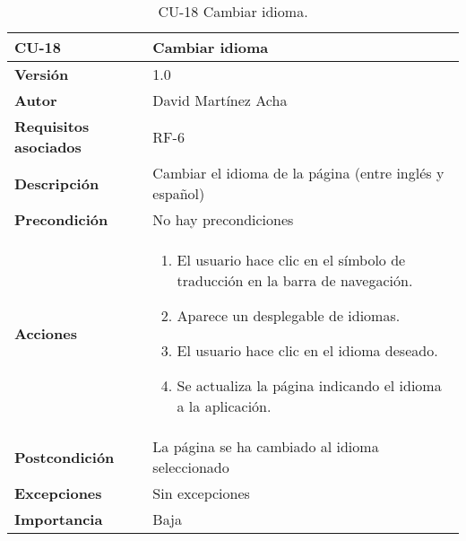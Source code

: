 \begin{table}[p]
	\centering
	\begin{tabularx}{\linewidth}{ p{} p{} }
		\toprule
		\textbf{CU-18}    & \textbf{Cambiar idioma}\\
		\toprule
		\textbf{Versión}              & 1.0    \\
		\textbf{Autor}                & David Martínez Acha \\
		\textbf{Requisitos asociados} & RF-6 \\
		\textbf{Descripción}          & Cambiar el idioma de la página (entre inglés y español) \\
		\textbf{Precondición}         & No hay precondiciones \\
		\textbf{Acciones}             &
		\begin{enumerate}
			\def\labelenumi{\arabic{enumi}.}
			\tightlist
			\item El usuario hace clic en el símbolo de traducción en la barra de navegación.
            \item Aparece un desplegable de idiomas.
            \item El usuario hace clic en el idioma deseado.
            \item Se actualiza la página indicando el idioma a la aplicación.
		\end{enumerate}\\
		\textbf{Postcondición}        & La página se ha cambiado al idioma seleccionado \\
		\textbf{Excepciones}          & Sin excepciones \\
		\textbf{Importancia}          & Baja \\
		\bottomrule
	\end{tabularx}
	\caption{CU-18 Cambiar idioma.}
\end{table}
